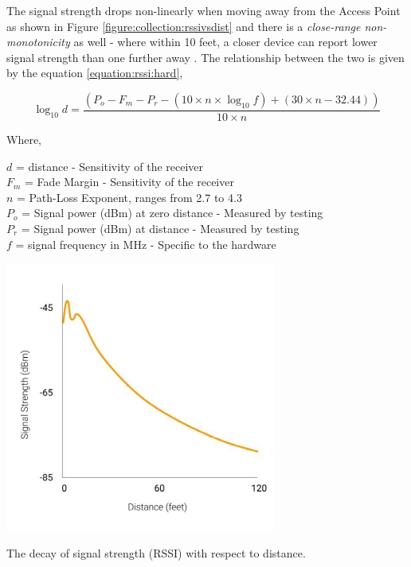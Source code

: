 The signal strength drops non-linearly when moving away from the Access Point as shown in Figure \ref{figure:collection:rssivsdist} and there is a \textit{close-range non-monotonicity} as well - where within 10 feet, a closer device can report lower signal strength than one further away \citep{cisco2008}.
The relationship between the two is given by the equation \cite{rssieq} \ref{equation:rssi:hard},

\begin{equation}
  \log_{10}{d} = \frac{(P_o - F_m - P_r - (10 \times n \times \log_{10}{f}) + ( 30 \times n - 32.44))}{10\times n}
  \label{equation:rssi:hard}
\end{equation}

Where,

\noindent
\(d\) = distance - Sensitivity of the receiver \\
\(F_m\) = Fade Margin - Sensitivity of the receiver \\
\(n\) = Path-Loss Exponent, ranges from 2.7 to 4.3 \\
\(P_o\) = Signal power (dBm) at zero distance - Measured by testing \\
\(P_r\) = Signal power (dBm) at distance - Measured by testing \\
\(f\) = signal frequency in MHz - Specific to the hardware \\

\vspace{1em}

\begin{marginfigure}
  \forcerectofloat
  \includegraphics{images/rssi-vs-dist.jpeg}
  \caption{The decay of signal strength (RSSI) with respect to distance.}
  \label{figure:collection:rssivsdist}
\end{marginfigure}

